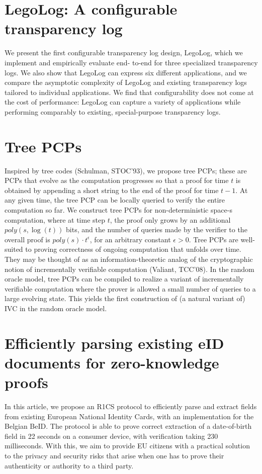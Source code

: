 \documentclass[11pt,oneside]{book}
\theoremstyle{definition}
\theoremstyle{remark}
\theoremstyle{plain}
\begin{document}
\section{\cite{cryptoeprint:2025/1234} {LegoLog}: A configurable transparency log}
We present the first configurable transparency log design,
LegoLog, which we implement and empirically evaluate end-
to-end for three specialized transparency logs. We also show
that LegoLog can express six different applications, and
we compare the asymptotic complexity of LegoLog and
existing transparency logs tailored to individual applications.
We find that configurability does not come at the cost of
performance: LegoLog can capture a variety of applications
while performing comparably to existing, special-purpose
transparency logs.

\section{\cite{cryptoeprint:2025/1252} Tree {PCPs}}

Inspired by tree codes (Schulman, STOC'93), we propose tree PCPs; these are PCPs that evolve as the computation progresses so that a proof for time $t$ is obtained by appending a short string to the end of the proof for time $t-1$. At any given time, the tree PCP can be locally queried to verify the entire computation so far.
We construct tree PCPs for non-deterministic space-s computation, where at time step $t$, the proof only grows by an additional $p o l y(s, \log (t))$ bits, and the number of queries made by the verifier to the overall proof is $p o l y(s) \cdot t^\epsilon$, for an arbitrary constant $\epsilon>0$.
Tree PCPs are well-suited to proving correctness of ongoing computation that unfolds over time. They may be thought of as an information-theoretic analog of the cryptographic notion of incrementally verifiable computation (Valiant, TCC'08). In the random oracle model, tree PCPs can be compiled to realize a variant of incrementally verifiable computation where the prover is allowed a small number of queries to a large evolving state. This yields the first construction of (a natural variant of) IVC in the random oracle model.

\section{\cite{cryptoeprint:2025/1266} Efficiently parsing existing {eID} documents for zero-knowledge proofs}
In this article, we propose an R1CS protocol to efficiently parse and extract fields from existing European National Identity Cards, with an implementation for the Belgian BeID.
The protocol is able to prove correct extraction of a date-of-birth field in 22 seconds on a consumer device, with verification taking 230 milliseconds. With this, we aim to provide EU citizens with a practical solution to the privacy and security risks that arise when one has to prove their authenticity or authority to a third party.
\end{document}
